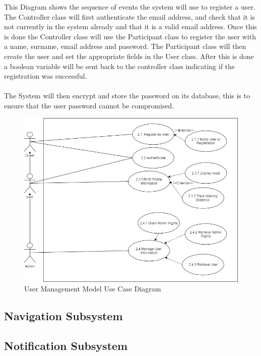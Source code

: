 \documentclass{article}
\begin{document}
			    {This Diagram shows the sequence of events the system will use to register a user. The Controller class will first authenticate the email address, and check that it is not currently in the system already and that it is a valid email address. Once this is done the Controller class will use the Participant class to register the user with a name, surname, email address and password. The Participant class will then create the user and set the appropriate fields in the User class. After this is done a boolean variable will be sent back to the controller class indicating if the registration was successful.\\\\
			    The System will then encrypt and store the password on its database, this is to ensure that the user password cannot be compromised.}
			    \begin{figure}[H]
                    \centering \includegraphics[height=0.55\textheight]{UMM-Diagrams/UMMUseCase}
                     \caption{User Management Model Use Case Diagram}
					 \label{fig:user_usecase}
			    \end{figure}
			    
			    
			\subsection{Navigation Subsystem}\label{subsec:navigation}
			
			\subsection{Notification Subsystem}\label{subsec:notification}
			
\end{document}
